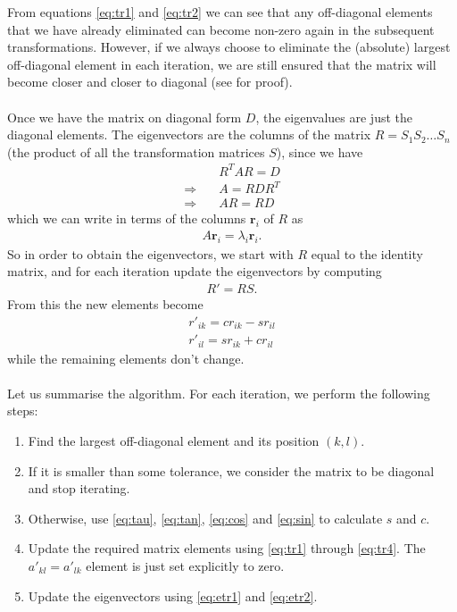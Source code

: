 \documentclass{article}
\begin{document}
From equations \eqref{eq:tr1} and \eqref{eq:tr2} we can see that any off-diagonal elements that we have already eliminated can become non-zero again in the subsequent transformations. However, if we always choose to eliminate the (absolute) largest off-diagonal element in each iteration, we are still ensured that the matrix will become closer and closer to diagonal (see \cite{cpyhsics} for proof).\\\\
Once we have the matrix on diagonal form $D$, the eigenvalues are just the diagonal elements. The eigenvectors are the columns of the matrix $R = S_1S_2\ldots S_n$ (the product of all the transformation matrices $S$), since we have
\begin{align*}
	&R^TAR = D \\
	\Rightarrow \quad &A = RDR^T \\
	\Rightarrow \quad &AR = RD
\end{align*}
which we can write in terms of the columns $\mathbf{r}_i$ of $R$ as
\begin{align*}
	A\mathbf{r}_i = \lambda_i\mathbf{r}_i.
\end{align*}
So in order to obtain the eigenvectors, we start with $R$ equal to the identity matrix, and for each iteration update the eigenvectors by computing
\begin{align*}
	R' = RS.
\end{align*}
From this the new elements become
\begin{align}
	r'_{ik} = cr_{ik} - sr_{il} \label{eq:etr1} \\
	r'_{il} = sr_{ik} + cr_{il} \label{eq:etr2}
\end{align}
while the remaining elements don't change.\\\\
Let us summarise the algorithm. For each iteration, we perform the following steps:
\begin{enumerate}
	\item Find the largest off-diagonal element and its position $(k, l)$.
	\item If it is smaller than some tolerance, we consider the matrix to be diagonal and stop iterating.
	\item Otherwise, use \eqref{eq:tau}, \eqref{eq:tan}, \eqref{eq:cos} and \eqref{eq:sin} to calculate $s$ and $c$.
	\item Update the required matrix elements using \eqref{eq:tr1} through \eqref{eq:tr4}. The $a'_{kl} = a'_{lk}$ element is just set explicitly to zero.
	\item Update the eigenvectors using \eqref{eq:etr1} and \eqref{eq:etr2}.
\end{enumerate}
\end{document}
